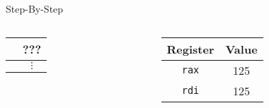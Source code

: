 \documentclass[hyphens,aspectratio=169]{beamer}
\begin{document}
\begin{frame}[fragile]{Step-By-Step}
\begin{columns}
\begin{column}{0.33\textwidth}
{\begin{tabular}{c|c|}
                \hline
                & ??? \\
                \hline
                & $\vdots$
            \end{tabular}}
        \end{column}
        \begin{column}{0.33\textwidth}
            \begin{tabular}{| c | c |}
                \hline
                Register & Value \\
                \hline
                \texttt{rax} & 125 \\
                \hline
                \texttt{rdi} & 125 \\
                \hline
            \end{tabular}
        \end{column}
    \end{columns}
\end{frame}
\end{document}
